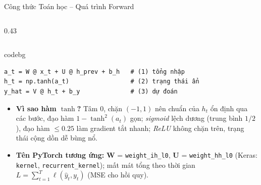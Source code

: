 \documentclass[aspectratio=169, 10pt]{beamer}
\newenvironment{codebox}{\begin{beamercolorbox}[sep=3pt, rounded=true]{codebg}\footnotesize\ttfamily}{\end{beamercolorbox}}
\begin{document}
\begin{frame}[fragile]{Công thức Toán học -- Quá trình Forward}
\begin{columns}[T]
\begin{column}{0.43\textwidth}
\end{column}
\end{columns}
\vspace{-0.1cm}
\begin{codebox}\begin{verbatim}
a_t = W @ x_t + U @ h_prev + b_h   # (1) tổng nhập
h_t = np.tanh(a_t)                 # (2) trạng thái ẩn
y_hat = V @ h_t + b_y              # (3) dự đoán
\end{verbatim}\end{codebox}
\vspace{-0.1cm}
\footnotesize
\begin{itemize}\itemsep-1pt
    \item \textbf{Vì sao hàm \(\tanh\)?} Tâm \(0\), chặn \((-1,1)\) nên chuẩn của \(h_t\) ổn định qua các bước, đạo hàm \(1-\tanh^2(a_t)\) gọn; \textit{sigmoid} lệch dương (trung bình \(1/2\)), đạo hàm \(\leq 0.25\) làm gradient tắt nhanh; \textit{ReLU} không chặn trên, trạng thái cộng dồn dễ bùng nổ.
    \item \textbf{Tên PyTorch tương ứng:} \(\mathbf{W}\) = \texttt{weight\_ih\_l0}, \(\mathbf{U}\) = \texttt{weight\_hh\_l0} (Keras: \texttt{kernel}, \texttt{recurrent\_kernel}); mất mát tổng theo thời gian \(L = \sum_{t=1}^{T} \ell(\hat{y}_t, y_t)\) (MSE cho hồi quy).
\end{itemize}
\end{frame}
\end{document}
